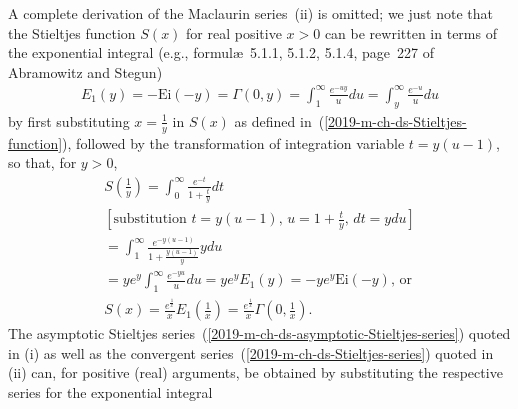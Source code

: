 {A complete derivation\cite[-5mm]{sommer-Stieltjes}
of the Maclaurin series~(ii) is omitted; we just note that
the Stieltjes function $S(x)$ for real positive $x>0$ can be rewritten in terms of
the exponential integral
(e.g., formul\ae~5.1.1, 5.1.2, 5.1.4, page~227 of Abramowitz and Stegun\cite{abramowitz:1964:hmf})
\begin{equation}
\begin{split}
E_1(y) =   -\text{Ei}(-y)
= \Gamma \left( 0, y \right)
=
\int_{1}^\infty    \frac{e^{-uy}}{u} du
=
\int_{y}^\infty    \frac{e^{-u}}{u} du
\end{split}
\label{2019-m-ch-ds-Stieltjes-Ei}
\end{equation}
by first substituting $x=\frac{1}{y}$ in $S(x)$ as defined in~(\ref{2019-m-ch-ds-Stieltjes-function}), followed by the transformation of integration variable
$t = y(u-1)$, so that, for $y>0$,
\begin{equation}
\begin{split}
S\left(\frac{1}{y}\right)
=  \int_0^\infty    \frac{e^{-t}}{1+\frac{t}{y}} dt\\
[\text{substitution } t = y(u-1)\text{, }u=1+\frac{t}{y}\text{, }dt =y du]\\
=  \int_1^\infty    \frac{e^{-y(u-1)}}{1+\frac{y(u-1)}{y}} y du\\
=ye^{y}\int_1^\infty    \frac{e^{-yu}}{u}  du
=  ye^{y}E_1(y)  =  -ye^{y}\text{Ei}(-y)
\text{, or}\\
S(x)=  \frac{e^\frac{1}{x}}{x} E_1\left(\frac{1}{x}\right)
= \frac{e^\frac{1}{x}}{x} \Gamma \left( 0, \frac{1}{x} \right)
.
\end{split}
\label{2019-m-ch-ds-Stieltjes-function-Ei}
\end{equation}
The asymptotic Stieltjes
series~(\ref{2019-m-ch-ds-asymptotic-Stieltjes-series})
quoted in (i)
as well as the convergent
series~(\ref{2019-m-ch-ds-Stieltjes-series})
quoted in (ii)
can, for positive (real) arguments, be obtained by substituting the respective series for the exponential integral
}
